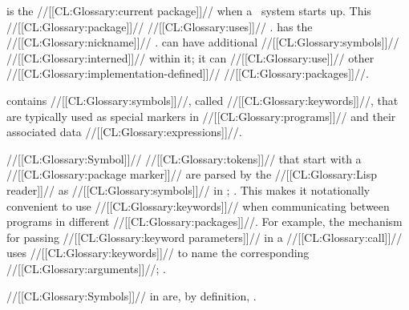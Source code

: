 \endsubsubsubsubsection%

\endsubsubsubsection%

\endsubsubsection%


 is the //[[CL:Glossary:current package]]// when 
a \clisp\ system starts up.  This //[[CL:Glossary:package]]// //[[CL:Glossary:uses]]// .
 has the //[[CL:Glossary:nickname]]// .
 can have additional //[[CL:Glossary:symbols]]// //[[CL:Glossary:interned]]// within it;
it can //[[CL:Glossary:use]]// other //[[CL:Glossary:implementation-defined]]// //[[CL:Glossary:packages]]//.

 
\endsubsubsection%









 contains //[[CL:Glossary:symbols]]//, called //[[CL:Glossary:keywords]]//,
that are typically used as special markers in //[[CL:Glossary:programs]]// 
and their associated data //[[CL:Glossary:expressions]]//.

//[[CL:Glossary:Symbol]]// //[[CL:Glossary:tokens]]// that start with a //[[CL:Glossary:package marker]]// 
are parsed by the //[[CL:Glossary:Lisp reader]]// as //[[CL:Glossary:symbols]]// 
in ; \seesection\SymbolTokens.
This makes it notationally convenient to use //[[CL:Glossary:keywords]]//
when communicating between programs in different //[[CL:Glossary:packages]]//.  
For example, the mechanism for passing //[[CL:Glossary:keyword parameters]]// in a //[[CL:Glossary:call]]// uses 
//[[CL:Glossary:keywords]]// to name the corresponding //[[CL:Glossary:arguments]]//;
\seesection\OrdinaryLambdaLists.

//[[CL:Glossary:Symbols]]// in  are, by definition, .


